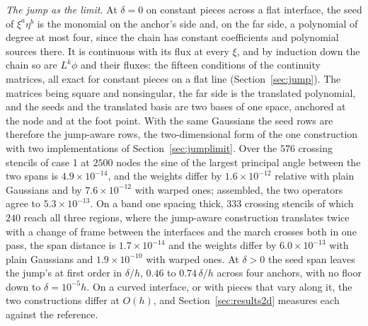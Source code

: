 \documentclass[11pt]{amsart}
\theoremstyle{definition}
\theoremstyle{remark}
\newcommand{\para}[1]{\par\smallskip\noindent\textit{#1}.\enspace}
\newcommand{\sci}[2]{#1 \times 10^{#2}}
\begin{document}
\para{The jump as the limit}
At $\delta = 0$ on constant pieces across a flat interface, the seed of
$\xi^a \eta^b$ is the monomial on the anchor's side and, on the far side, a
polynomial of degree at most four, since the chain has constant
coefficients and polynomial sources there. It is continuous with its flux
at every $\xi$, and by induction down the chain so are $L^k \phi$ and their
fluxes: the fifteen conditions of the continuity matrices, all exact for
constant pieces on a flat line (Section~\ref{sec:jump}). The matrices being
square and nonsingular, the far side is the translated polynomial, and the
seeds and the translated basis are two bases of one space, anchored at the
node and at the foot point. With the same Gaussians the seed rows are
therefore the jump-aware rows, the two-dimensional form of the one
construction with two implementations of Section~\ref{sec:jumplimit}. Over
the $576$ crossing stencils of case 1 at $2500$ nodes the sine of the
largest principal angle between the two spans is $\sci{4.9}{-14}$, and the
weights differ by $\sci{1.6}{-12}$ relative with plain Gaussians and by
$\sci{7.6}{-12}$ with warped ones; assembled, the two operators agree to
$\sci{5.3}{-13}$. On a band one spacing thick, $333$ crossing stencils of
which $240$ reach all three regions, where the jump-aware construction
translates twice with a change of frame between the interfaces and the
march crosses both in one pass, the span distance is $\sci{1.7}{-14}$ and
the weights differ by $\sci{6.0}{-13}$ with plain Gaussians and
$\sci{1.9}{-10}$ with warped ones. At $\delta > 0$ the seed span leaves
the jump's at first order in $\delta / h$, $0.46$ to $0.74\,\delta / h$
across four anchors, with no floor down to $\delta = 10^{-5} h$. On a curved
interface, or with pieces that vary along it, the two constructions differ
at $O(h)$, and Section~\ref{sec:results2d} measures each against the
reference.
\end{document}
